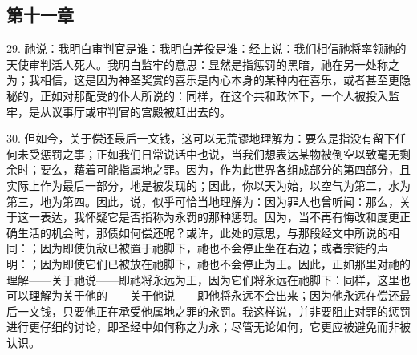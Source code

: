 
\subsection{第十一章}

29. 祂说：我明白审判官是谁：我明白差役是谁：经上说：我们相信祂将率领祂的天使审判活人死人。我明白监牢的意思：显然是指惩罚的黑暗，祂在另一处称之为；我相信，这是因为神圣奖赏的喜乐是内心本身的某种内在喜乐，或者甚至更隐秘的，正如对那配受的仆人所说的：同样，在这个共和政体下，一个人被投入监牢，是从议事厅或审判官的宫殿被赶出去的。\par

30. 但如今，关于偿还最后一文钱，这可以无荒谬地理解为：要么是指没有留下任何未受惩罚之事；正如我们日常说话中也说，当我们想表达某物被倒空以致毫无剩余时；要么，藉着可能指属地之罪。因为，作为此世界各组成部分的第四部分，且实际上作为最后一部分，地是被发现的；因此，你以天为始，以空气为第二，水为第三，地为第四。因此，说，似乎可恰当地理解为：因为罪人也曾听闻：那么，关于这一表达，我怀疑它是否指称为永罚的那种惩罚。因为，当不再有悔改和度更正确生活的机会时，那债如何偿还呢？或许，此处的意思，与那段经文中所说的相同：；因为即使仇敌已被置于祂脚下，祂也不会停止坐在右边；或者宗徒的声明：；因为即使它们已被放在祂脚下，祂也不会停止为王。因此，正如那里对祂的理解——关于祂说——即祂将永远为王，因为它们将永远在祂脚下：同样，这里也可以理解为关于他的——关于他说——即他将永远不会出来；因为他永远在偿还最后一文钱，只要他正在承受他属地之罪的永罚。我这样说，并非要阻止对罪的惩罚进行更仔细的讨论，即圣经中如何称之为永；尽管无论如何，它更应被避免而非被认识。\par

